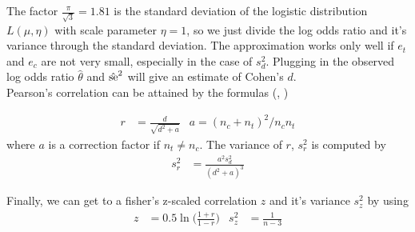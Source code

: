 \documentclass[11pt,a4paper,twoside]{book}\usepackage[]{graphicx}\usepackage[]{color}
\begin{document}
The factor $\frac{\pi}{\sqrt{3}} = 1.81$ is the standard deviation of the logistic distribution $L(\mu, \eta)$ with scale parameter $\eta = 1$, so we just divide the log odds ratio and it's variance through the standard deviation. The approximation works only well if $e_t$ and $e_c$ are not very small, especially in the case of $s_d^2$. Plugging in the observed log odds ratio $\hat{\theta}$ and $\hat{\operatorname{se}}^2$ will give an estimate of Cohen's $d$.\\
Pearson's correlation can be attained by the formulas (\citet{olkin1985dtor}, \cite[48]{Intro.meta})

\begin{align}
r &= \frac{d}{\sqrt{d^2 + a}} & a = (n_c + n_t)^2 / n_c n_t \nonumber
\end{align}
where $a$ is a correction factor if $n_t \neq n_c$. The variance of $r$, $s_r^2$ is computed by
\begin{align}
s_r^2 &= \frac{a^2 s_d^2}{(d^2 + a)^3} \nonumber
\end{align}

Finally, we can get to a fisher's z-scaled correlation $z$ and it's variance $s_z^2$ by using
\begin{align}
z &= 0.5 \ln\big(\frac{1 + r}{1 - r}\big) & \nonumber
s_z^2 &= \frac{1}{n-3}
\end{align}















\end{document}
